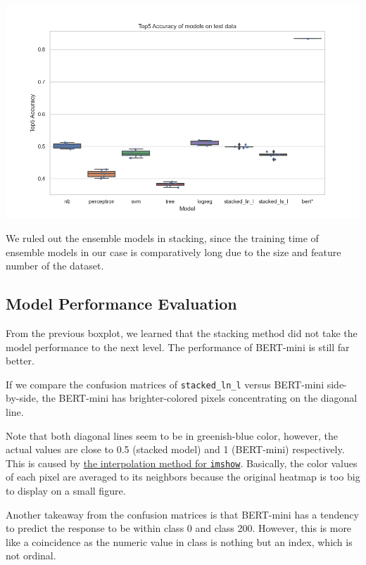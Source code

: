 \documentclass[
]{kaohandt}
\begin{document}
\includegraphics{metric_test_score}

We ruled out the ensemble models in stacking, since the training time of ensemble models in our case is comparatively long due to the size and feature number of the dataset.

\subsection*{Model Performance Evaluation}

From the previous boxplot, we learned that the stacking method did not take the model performance to the next level. The performance of BERT-mini is still far better.

If we compare the confusion matrices of \texttt{stacked\_ln\_l} versus BERT-mini side-by-side, the BERT-mini has brighter-colored pixels concentrating on the diagonal line.

Note that both diagonal lines seem to be in greenish-blue color, however, the actual values are close to 0.5 (stacked model) and 1 (BERT-mini) respectively. This is caused by \href{https://matplotlib.org/stable/gallery/images_contours_and_fields/interpolation_methods.html}{the interpolation method for \texttt{imshow}}. Basically, the color values of each pixel are averaged to its neighbors because the original heatmap is too big to display on a small figure.

Another takeaway from the confusion matrices is that BERT-mini has a tendency to predict the response to be within class 0 and class 200. However, this is more like a coincidence as the numeric value in class is nothing but an index, which is not ordinal.
\end{document}
